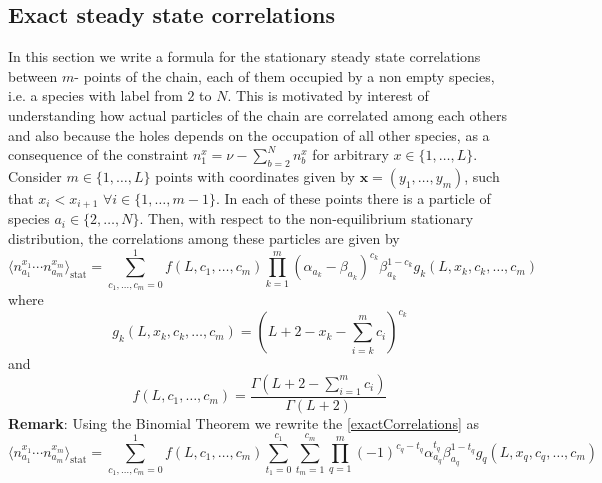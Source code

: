 \documentclass[11pt]{article}
\numberwithin{equation}{section}
\numberwithin{equation}{subsection}
\begin{document}
\subsection{Exact steady state correlations}\label{correlation-section}
In this section we write a formula for the stationary steady state correlations between $m$- points of the chain, each of them occupied by a non empty species, i.e. a species with label from $2$ to $N$. This is motivated by interest of understanding how actual particles of the chain are correlated among each others and also because the holes depends on the occupation of all other species, as a consequence of the constraint $n_{1}^{x}=\nu-\sum_{b=2}^{N}n_{b}^{x}$ for arbitrary $x\in \{1,\ldots,L\}$. Consider $m\in \{1,\ldots,L\}$ points with coordinates given by $\bm{x}=(y_{1},\ldots,y_{m})$, such that $x_{i}<x_{i+1}$ $\forall i\in \{1,\ldots,m-1\}$. In each of these points there is a particle of species $a_{i}\in \{2,\ldots,N\}$. Then, with respect to the non-equilibrium stationary distribution, the correlations among these particles are given by
\begin{equation}\label{exactCorrelations}
		\langle n^{x_{1}}_{a_{1}}\cdots n^{x_{m}}_{a_{m}}\rangle_{\text{stat}}=\sum_{c_{1},\ldots,c_{m}=0}^{1}
			f(L,c_{1},\ldots,c_{m})\prod_{k=1}^{m}(\alpha_{a_{k}}-\beta_{a_{k}})^{c_{k}}\beta_{a_{k}}^{1-c_{k}}g_{k}(L,x_{k},c_{k},\ldots,c_{m})
	\end{equation}
	where 
	\begin{equation}\label{powerCoeffSpecies}
		g_{k}(L,x_{k},c_{k},\ldots,c_{m})=\left(L+2-x_{k}-\sum_{i=k}^{m}c_{i}\right)^{c_{k}}
	\end{equation}
	and 
	\begin{equation}\label{powerCoeffNOspec}
		f(L,c_{1},\ldots,c_{m})=\frac{\Gamma(L+2-\sum_{i=1}^{m}c_{i})}{\Gamma(L+2)}
	\end{equation}
\textbf{Remark}: Using the Binomial Theorem we rewrite the \eqref{exactCorrelations} as 
\begin{equation}
\langle n^{x_{1}}_{a_{1}}\cdots n^{x_{m}}_{a_{m}}\rangle_{\text{stat}}=\sum_{c_{1},\ldots,c_{m}=0}^{1}
f(L,c_{1},\ldots,c_{m})\sum_{t_{1}=0}^{c_{1}}\sum_{t_{m}=1}^{c_{m}}\prod_{q=1}^{m}(-1)^{c_{q}-t_{q}}\alpha_{a_{q}}^{t_{q}}\beta_{a_{q}}^{1-t_{q}}g_{q}(L,x_{q},c_{q},\ldots,c_{m})
\end{equation}
\end{document}
